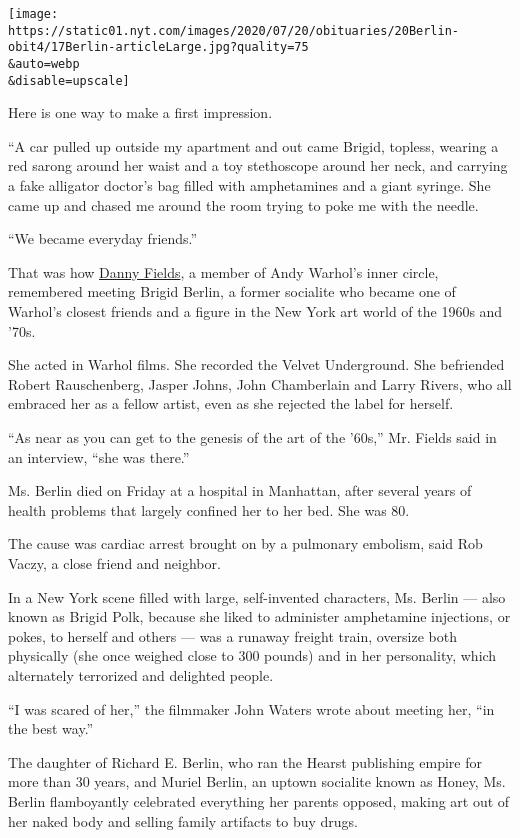 \texttt{[image: https://static01.nyt.com/images/2020/07/20/obituaries/20Berlin-obit4/17Berlin-articleLarge.jpg?quality=75\\\&auto=webp\\\&disable=upscale]}

Here is one way to make a first impression.

``A car pulled up outside my apartment and out came Brigid, topless,
wearing a red sarong around her waist and a toy stethoscope around her
neck, and carrying a fake alligator doctor's bag filled with
amphetamines and a giant syringe. She came up and chased me around the
room trying to poke me with the needle.

``We became everyday friends.''

That was how
\href{https://www.theguardian.com/film/2016/oct/07/danny-fields-documentary-film-danny-says-ramones}{Danny
Fields}, a member of Andy Warhol's inner circle, remembered meeting
Brigid Berlin, a former socialite who became one of Warhol's closest
friends and a figure in the New York art world of the 1960s and '70s.

She acted in Warhol films. She recorded the Velvet Underground. She
befriended Robert Rauschenberg, Jasper Johns, John Chamberlain and Larry
Rivers, who all embraced her as a fellow artist, even as she rejected
the label for herself.

``As near as you can get to the genesis of the art of the '60s,'' Mr.
Fields said in an interview, ``she was there.''

Ms. Berlin died on Friday at a hospital in Manhattan, after several
years of health problems that largely confined her to her bed. She was
80.

The cause was cardiac arrest brought on by a pulmonary embolism, said
Rob Vaczy, a close friend and neighbor.

In a New York scene filled with large, self-invented characters, Ms.
Berlin --- also known as Brigid Polk, because she liked to administer
amphetamine injections, or pokes, to herself and others --- was a
runaway freight train, oversize both physically (she once weighed close
to 300 pounds) and in her personality, which alternately terrorized and
delighted people.

``I was scared of her,'' the filmmaker John Waters wrote about meeting
her, ``in the best way.''

The daughter of Richard E. Berlin, who ran the Hearst publishing empire
for more than 30 years, and Muriel Berlin, an uptown socialite known as
Honey, Ms. Berlin flamboyantly celebrated everything her parents
opposed, making art out of her naked body and selling family artifacts
to buy drugs.

